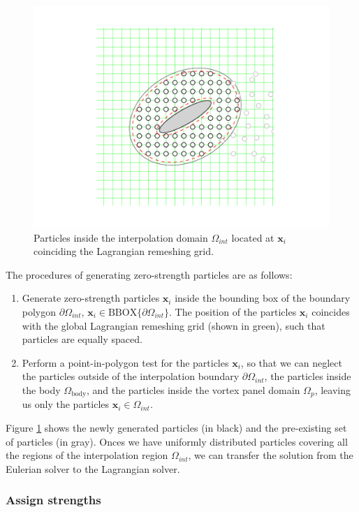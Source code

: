 	\begin{figure}[h]
	\centering
	\includegraphics[trim=4.37cm 2.3cm 4.cm 2.cm, clip, width=0.5\linewidth]{./figures/hybrid/interpolation/ellipse/generatedParticles.pdf}
	\caption{Particles inside the interpolation domain $\Omega_{int}$ located at $\mathbf{x}_i$ coinciding the Lagrangian remeshing grid.}
	\label{fig:generatedParticles}
	\end{figure}

The procedures of generating zero-strength particles are as follows:
\begin{enumerate}
\item Generate zero-strength particles $\mathbf{x}_i$ inside the bounding box of the boundary polygon $\partial \Omega_{int}$, $\mathbf{x}_i \in \mathrm{BBOX}\{\partial \Omega_{int}\}$. The position of the particles $\mathbf{x}_i$ coincides with the global Lagrangian remeshing grid (shown in green), such that particles are equally spaced.
\item Perform a point-in-polygon test for the particles $\mathbf{x}_i$, so that we can neglect the particles outside of the interpolation boundary $\partial \Omega_{int}$, the particles inside the body $\Omega_{\mathrm{body}}$, and the particles inside the vortex panel domain $\Omega_p$, leaving us only the particles $\mathbf{x}_i \in \Omega_{int}$.
\end{enumerate}

Figure \ref{fig:generatedParticles} shows the newly generated particles (in black) and the pre-existing set of particles (in gray). Onces we have uniformly distributed particles covering all the regions of the interpolation region $\Omega_{int}$, we can transfer the solution from the Eulerian solver to the Lagrangian solver.

\subsubsection*{Assign strengths}

